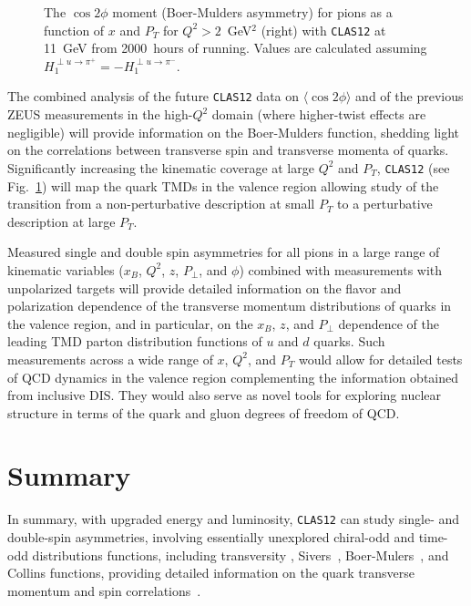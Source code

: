 \begin{figure}[htbp]
\vspace{6.9cm}
\caption{\small{The $\cos2\phi$ moment (Boer-Mulders asymmetry) for pions
as a function of $x$ and $P_T$ for $Q^2>2$~GeV$^2$ (right) with {\tt CLAS12} 
at 11~GeV from 2000~hours of running.  Values are calculated assuming
$H_1^{\perp u\rightarrow \pi^+}=-H_1^{\perp u\rightarrow \pi^-}$.}}
\label{fig:aucos21mx}
\end{figure}

The combined analysis of the future {\tt CLAS12} data on 
$\langle \cos 2 \phi \rangle$ and of the previous ZEUS measurements in the 
high-$Q^2$ domain (where higher-twist effects are negligible) will provide 
information on the Boer-Mulders function, shedding light on the correlations 
between transverse spin and transverse momenta of quarks.  Significantly 
increasing the kinematic coverage at large $Q^2$ and $P_T$, {\tt CLAS12}
(see Fig.~\ref{fig:aucos21mx}) will map the quark TMDs in the valence region
allowing study of the transition from a non-perturbative description at small 
$P_T$ to a perturbative description at large $P_T$.
 
Measured single and double spin asymmetries for all pions in a large range of 
kinematic variables ($x_B$, $Q^2$, $z$, $P_{\perp}$, and $\phi$) combined with 
measurements with unpolarized targets will provide detailed information on the 
flavor and polarization dependence of the transverse momentum distributions of 
quarks in the valence region, and in particular, on the $x_B$, $z$, and 
$P_{\perp}$ dependence of the leading TMD parton distribution functions of $u$ 
and $d$ quarks.  Such measurements across a wide range of $x$, $Q^2$, and $P_T$ 
would allow for detailed tests of QCD dynamics in the valence region 
complementing the information obtained from inclusive DIS.  They would also 
serve as novel tools for exploring nuclear structure in terms of the quark and 
gluon degrees of freedom of QCD.

\section{Summary}

In summary, with upgraded energy and luminosity, {\tt CLAS12} can study 
single- and double-spin asymmetries, involving essentially unexplored 
chiral-odd and time-odd distributions functions, including transversity
\cite{Ralston:1979ys,Jaffe:1991ra}, Sivers~\cite{Sivers:1990fh,Brodsky:2002cx,
Collins:2002kn,Ji:2002aa}, Boer-Mulers~\cite{Boer:1997nt}, and Collins
\cite{Collins:1992kk} functions, providing detailed information on the quark 
transverse momentum and spin correlations~\cite{Collins:1992kk,Kotzinian:1994dv,
Mulders:1995dh,Brodsky:2002rv,Jaffe:2002pj}.

